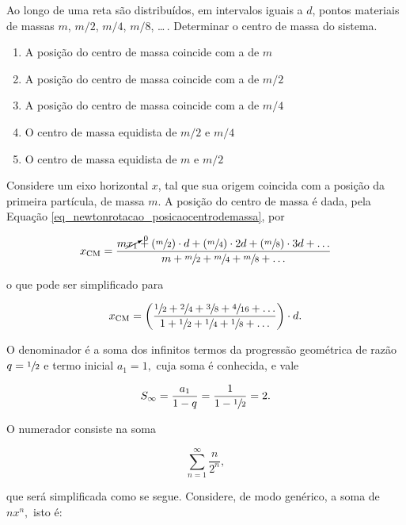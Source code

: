 \begin{exemplo}\label{exemplo_dinamicarotacao_centrodemassaex03}

Ao longo de uma reta são distribuídos, em intervalos iguais a $d$, pontos materiais de massas
$m$, $m/2$, $m/4$, $m/8$, \ldots\,. Determinar o centro de massa do sistema.

\begin{enumerate}
    \item[a)] A posição do centro de massa coincide com a de $m$
    \item[b)] A posição do centro de massa coincide com a de $m/2$
    \item[c)] A posição do centro de massa coincide com a de $m/4$
    \item[d)] O centro de massa equidista de $m/2$ e $m/4$
    \item[e)] O centro de massa equidista de $m$ e $m/2$
\end{enumerate}


\resolucao

Considere um eixo horizontal $x$, tal que sua origem coincida com a posição da primeira partícula, de massa $m$. A posição do centro de massa é dada, pela Equação \eqref{eq_newtonrotacao_posicaocentrodemassa}, por


$$ x_\text{CM} = \dfrac{m \cancelto{0}{x_1}+ (\sfrac{m}{2}) \cdot d + (\sfrac{m}{4}) \cdot 2d +  (\sfrac{m}{8}) \cdot 3d + \dots  }{m + \sfrac{m}{2} + \sfrac{m}{4} + \sfrac{m}{8} + \dots }$$

\noindent o que pode ser simplificado para

$$ x_\text{CM} = \left( \dfrac{\sfrac{1}{2} + \sfrac{2}{4} + \sfrac{3}{8} + \sfrac{4}{16} + \dots }{1 + \sfrac{1}{2} +  \sfrac{1}{4} +  \sfrac{1}{8} + \dots }  \right) \cdot d .$$

O denominador é a soma dos infinitos termos da progressão geométrica de razão $q = \sfrac{1}{2}$ e termo inicial $a_1=1,$ cuja soma é conhecida, e vale

$$ S_{\infty} = \dfrac{a_1}{1-q} = \dfrac{1}{1-\sfrac{1}{2}} = 2.$$

O numerador consiste na soma 

\begin{equation}
    \sum_{n=1}^{\infty} \dfrac{n}{2^n},
    \label{eq_centrodemassa_exemplo}
\end{equation}


\noindent que será simplificada como se segue. Considere, de modo genérico, a soma de $nx^n,$ isto é:


\end{exemplo}
